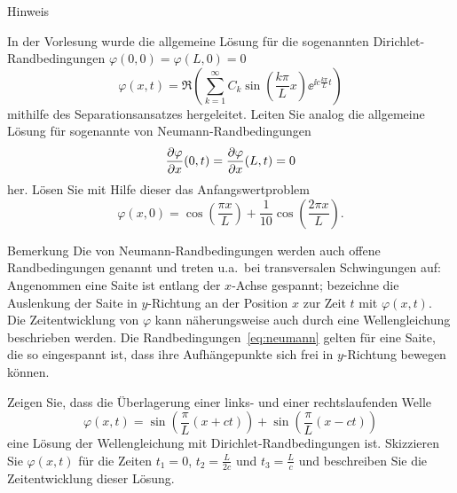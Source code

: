 \documentclass{scrartcl}
\begin{document}
\begin{subex}
\begin{remark}{Hinweis}
  \end{remark}


  \item{} In der Vorlesung wurde die allgemeine Lösung für die sogenannten Dirichlet-Randbedingungen $\varphi(0, 0) = \varphi(L, 0) = 0$ 
  \[
    \varphi(x, t) = \Re \left( \sum_{k=1}^\infty C_k \sin \left( \frac{k\pi}{L} x \right) \ee^{\ii c \frac{k\pi}{L} t} \right)
  \]
  mithilfe des Separationsansatzes hergeleitet.
  Leiten Sie analog die allgemeine Lösung für sogenannte von Neumann-Randbedingungen 
  \[
    \pderiv[\varphi]{x}(0, t) = \pderiv[\varphi]{x}(L, t) = 0
    \label{eq:neumann}
  \]
  her.
  Lösen Sie mit Hilfe dieser das Anfangswertproblem
  \[
    \varphi(x, 0) = \cos\left(\frac{\pi x}{L}\right) + \frac{1}{10} \cos\left( \frac{2\pi x}{L} \right).
  \]
  \begin{remark}{Bemerkung}
    Die von Neumann-Randbedingungen werden auch offene Randbedingungen genannt und treten u.a.\ bei transversalen Schwingungen auf:
    Angenommen eine Saite ist entlang der $x$-Achse gespannt; bezeichne die Auslenkung der Saite in $y$-Richtung an der Position $x$ zur Zeit $t$ mit $\varphi(x, t)$.
    Die Zeitentwicklung von $\varphi$ kann näherungsweise auch durch eine Wellengleichung beschrieben werden.
    Die Randbedingungen~\eqref{eq:neumann} gelten für eine Saite, die so eingespannt ist, dass ihre Aufhängepunkte sich frei in $y$-Richtung bewegen können.
  \end{remark}


  \item{} Zeigen Sie, dass die Überlagerung einer links- und einer rechtslaufenden Welle
  \[
    \varphi(x, t) = \sin\left( \frac{\pi}{L} (x + ct) \right) + \sin\left( \frac{\pi}{L} (x - ct) \right)
  \]
  eine Lösung der Wellengleichung mit Dirichlet-Randbedingungen ist.
  Skizzieren Sie $\varphi(x, t)$ für die Zeiten $t_1 = 0$, $t_2 = \frac{L}{2c}$ und $t_3 = \frac{L}{c}$ und beschreiben Sie die Zeitentwicklung dieser Lösung.
\end{subex}
\end{document}
